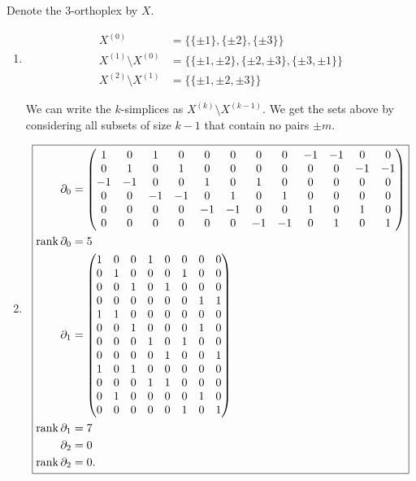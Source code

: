 \documentclass[12 pt, letterpaper]{hmcpset}
\begin{document}
\begin{solution}
	Denote the $3$-orthoplex by $X$.
	\begin{enumerate}
		\item
			\[
				\boxed{
					\begin{split}
						X^{(0)} & = \{ \{ \pm 1 \}, \{ \pm 2 \}, \{ \pm 3 \} \} \\
						X^{(1)} \setminus X^{(0)} & = \{ \{ \pm 1, \pm 2 \}, \{ \pm 2, \pm 3 \}, \{ \pm 3, \pm 1 \} \} \\
						X^{(2)} \setminus X^{(1)} & = \{ \{ \pm 1, \pm 2, \pm 3 \} \}
					\end{split}
				}
			\]

			We can write the $k$-simplices as $X^{(k)} \setminus X^{(k - 1)}$. We get the sets above by considering all subsets of size $k - 1$ that contain no pairs $\pm m$.

		\item
			\[
				\boxed{
					\begin{split}
						\setcounter{MaxMatrixCols}{20}
						\partial_{0} & = \begin{pmatrix}
1 &  0 &  1 &  0 &  0 &  0 &  0 &  0 & -1 & -1 &  0 &  0 \\
 0 &  1 &  0 &  1 &  0 &  0 &  0 &  0 &  0 &  0 & -1 & -1 \\
-1 & -1 &  0 &  0 &  1 &  0 &  1 &  0 &  0 &  0 &  0 &  0 \\
 0 &  0 & -1 & -1 &  0 &  1 &  0 &  1 &  0 &  0 &  0 &  0 \\
 0 &  0 &  0 &  0 & -1 & -1 &  0 &  0 &  1 &  0 &  1 &  0 \\
 0 &  0 &  0 &  0 &  0 &  0 & -1 & -1 &  0 &  1 &  0 &  1 
\end{pmatrix} \\
						\operatorname{rank} \partial_{0} & = 5 \\
						\partial_{1} & = \begin{pmatrix}
1 & 0 & 0 & 1 & 0 & 0 & 0 & 0 \\
0 & 1 & 0 & 0 & 0 & 1 & 0 & 0 \\
0 & 0 & 1 & 0 & 1 & 0 & 0 & 0 \\
0 & 0 & 0 & 0 & 0 & 0 & 1 & 1 \\
1 & 1 & 0 & 0 & 0 & 0 & 0 & 0 \\
0 & 0 & 1 & 0 & 0 & 0 & 1 & 0 \\
0 & 0 & 0 & 1 & 0 & 1 & 0 & 0 \\
0 & 0 & 0 & 0 & 1 & 0 & 0 & 1 \\
1 & 0 & 1 & 0 & 0 & 0 & 0 & 0 \\
0 & 0 & 0 & 1 & 1 & 0 & 0 & 0 \\
0 & 1 & 0 & 0 & 0 & 0 & 1 & 0 \\
0 & 0 & 0 & 0 & 0 & 1 & 0 & 1 
\end{pmatrix} \\
							\operatorname{rank} \partial_{1} & = 7 \\
							\partial_{2} & = 0 \\
							\operatorname{rank} \partial_{2} & = 0.
					\end{split}
				}
			\]


\end{enumerate}
\end{solution}
\end{document}
